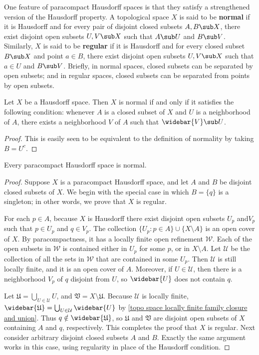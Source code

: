 One feature of paracompact Hausdorff spaces is that they satisfy a strengthened version of the Hausdorff property. A topological space $X$ is said to be \textbf{normal} if it is Hausdorff and for every pair of disjoint closed subsets $A,B\sub X$, there exist disjoint open subsets $U,V\sub X$ such that $A\sub U$ and $B\sub V$. Similarly, $X$ is said to be \textbf{regular} if it is Hausdorff and for every closed subset $B\sub X$ and point $a\in B$, there exist disjoint open subsets $U,V\sub X$ such that $a\in U$ and $B\sub V$. Briefly, in normal spaces, closed subsets can be separated by open subsets; and in regular spaces, closed subsets can be separated from points by open subsets.
\begin{lemma}\label{Hausdorff normal iff}
Let $X$ be a Hausdorff space. Then $X$ is normal if and only if it satisfies the following condition: whenever $A$ is a closed subset of $X$ and $U$ is a neighborhood of $A$, there exists a neighborhood $V$ of $A$ such that $\widebar{V}\sub U$.
\end{lemma}
\begin{proof}
This is easily seen to be equivalent to the definition of normality by taking
$B=U^c$.
\end{proof}
\begin{theorem}\label{para is normal}
Every paracompact Hausdorff space is normal.
\end{theorem}
\begin{proof}
Suppose $X$ is a paracompact Hausdorff space, and let $A$ and $B$ be disjoint closed subsets of $X$. We begin with the special case in which $B=\{q\}$ is a singleton; in other words, we prove that $X$ is regular.\par
For each $p\in A$, because $X$ is Hausdorff there exist disjoint open subsets $U_p$ and$V_p$ such that $p\in U_p$ and $q\in V_p$. The collection $\{U_p:p\in A\}\cup\{X\setminus A\}$ is an open cover of $X$. By paracompactness, it has a locally finite open refinement $\mathcal{W}$. Each of the open subsets in $\mathcal{W}$ is contained either in $U_p$ for some $p$, or in $X\setminus A$. Let $\mathcal{U}$ be the collection of all the sets in $\mathcal{W}$ that are contained in some $U_p$. Then $\mathcal{U}$ is
still locally finite, and it is an open cover of $A$. Moreover, if $U\in\mathcal{U}$, then there is a neighborhood $V_p$ of $q$ disjoint from $U$, so $\widebar{U}$ does not contain $q$.\par
Let $\mathfrak{U}=\bigcup_{U\in\mathcal{U}}U$, and $\mathfrak{V}=X\setminus \mathfrak{U}$. Because $\mathcal{U}$ is locally finite, $\widebar{\mathfrak{U}}=\bigcup_{U\in\mathcal{U}}\widebar{U}$
by \cref{topo space locally finite family closure and union}. Thus $q\notin\widebar{\mathfrak{U}}$, so $\mathfrak{U}$ and $\mathfrak{V}$ are disjoint open subsets of $X$ containing $A$ and $q$, respectively. This completes the proof that $X$ is regular. Next consider arbitrary disjoint closed subsets $A$ and $B$. Exactly the same argument
works in this case, using regularity in place of the Hausdorff condition.
\end{proof}
